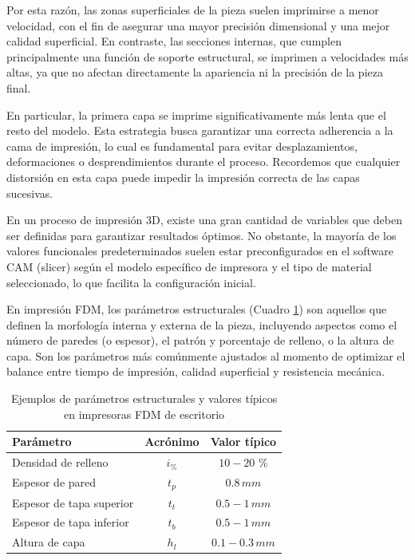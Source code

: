 Por esta razón, las zonas superficiales de la pieza suelen imprimirse a menor velocidad, con el fin de asegurar una mayor precisión dimensional y una mejor calidad superficial. En contraste, las secciones internas, que cumplen principalmente una función de soporte estructural, se imprimen a velocidades más altas, ya que no afectan directamente la apariencia ni la precisión de la pieza final.

En particular, la primera capa se imprime significativamente más lenta que el resto del modelo. Esta estrategia busca garantizar una correcta adherencia a la cama de impresión, lo cual es fundamental para evitar desplazamientos, deformaciones o desprendimientos durante el proceso. Recordemos que cualquier distorsión en esta capa puede impedir la impresión correcta de las capas sucesivas.

En un proceso de impresión 3D, existe una gran cantidad de variables que deben ser definidas para garantizar resultados óptimos. No obstante, la mayoría de los valores funcionales predeterminados suelen estar preconfigurados en el software CAM (slicer) según el modelo específico de impresora y el tipo de material seleccionado, lo que facilita la configuración inicial.

En impresión FDM, los parámetros estructurales (Cuadro \ref{tab:param-estructurales}) son aquellos que definen la morfología interna y externa de la pieza, incluyendo aspectos como el número de paredes (o espesor), el patrón y porcentaje de relleno, o la altura de capa. Son los parámetros más comúnmente ajustados al momento de optimizar el balance entre tiempo de impresión, calidad superficial y resistencia mecánica.

\begin{table}[ht]
  \centering
  \caption{Ejemplos de parámetros estructurales y valores típicos en impresoras FDM de escritorio}
  \label{tab:param-estructurales}
  \begin{tabular}{@{} l c c @{}}
    \toprule
    Parámetro                   & Acrónimo       & Valor típico     \\
    \midrule
    Densidad de relleno        & $i_{\%}$     &     $\mathrm{10-20}$ $\%$\\
    Espesor de pared            & $t_{p}$        &   $\mathrm{0.8}\,mm$  \\
    Espesor de tapa superior          & $t_{t}$ & $\mathrm{0.5-1}\,mm$\\
    Espesor de tapa inferior            & $t_{b}$ & $\mathrm{0.5-1}\, mm$\\
    Altura de capa           & $h_{l}$            &  $\mathrm{0.1-0.3}\, mm$    \\
    \bottomrule
  \end{tabular}
\end{table}

